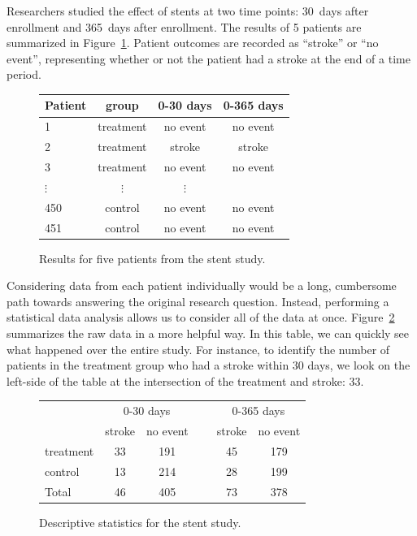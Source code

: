 Researchers studied the effect of stents at two time points: 30~days after enrollment and 365~days after enrollment. The results of 5 patients are summarized in Figure~\ref{stentStudyResultsDF}. Patient outcomes are recorded as ``stroke'' or ``no event'', representing whether or not the patient had a stroke at the end of a time period.

\begin{figure}[h]
\centering
\begin{tabular}{l ccc}
\hline
Patient	&	group	&	0-30 days 	&	0-365 days \\
\hline
1		&	treatment &	no event &	no event \\
2		&	treatment &	stroke & stroke \\
3		&	treatment &	no event & no event \\
$\vdots$	&	$\vdots$	  &	$\vdots$ \\
450	&	control &	no event &	no event \\
451	&	control &	no event &	no event \\
\hline
\end{tabular}
\caption{Results for five patients from the stent study.}
\label{stentStudyResultsDF}
\end{figure}

Considering data from each patient individually would be a long, cumbersome path towards answering the original research question. Instead, performing a statistical data analysis allows us to consider all of the data at once. Figure~\ref{stentStudyResults} summarizes the raw data in a more helpful way. In this table, we can quickly see what happened over the entire study. For instance, to identify the number of patients in the treatment group who had a stroke within 30 days, we look on the left-side of the table at the intersection of the treatment and stroke: 33.

\begin{figure}[h]
\centering
\begin{tabular}{l cc c cc}
& \multicolumn{2}{c}{0-30 days} &\hspace{5mm}\ & \multicolumn{2}{c}{0-365 days} \\
  \cline{2-3} \cline{5-6}
	& 	stroke 	& no event && 	stroke 	& no event \\
  \hline
treatment 	& 33		& 191	&&	45 	& 179 \\
control 		& 13		& 214	&& 	28	& 199 \\
  \hline
Total				& 46		& 405	&&	73	& 378 \\
  \hline
\end{tabular}
\caption{Descriptive statistics for the stent study.}
\label{stentStudyResults}
\end{figure}

